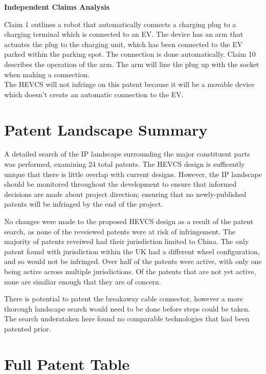 \documentclass [12pt]{article}
\begin{document}
\textbf{Independent Claims Analysis}

Claim 1 outlines a robot that automatically connects a charging plug to a charging terminal which is connected to an EV. The device has an arm that actuates the plug to the charging unit, which has been connected to the EV parked within the parking spot. The connection is done automatically.
Claim 10 describes the operation of the arm. The arm will line the plug up with the socket when making a connection.
\\
The HEVCS will not infringe on this patent because it will be a movable device which doesn’t create an automatic connection to the EV.

\section{Patent Landscape Summary}
A detailed search of the IP landscape surrounding the major constituent parts was performed, examining 24 total patents. The HEVCS design is sufficently unique that there is little overlap with current designs. However, the IP landscape should be monitored throughout the development to ensure that informed decisions are made about project direction; ensuring that no newly-published patents will be infringed by the end of the project.

No changes were made to the proposed HEVCS design as a result of the patent search, as none of the reveiewed patents were at risk of infringement. The majority of patents reveiwed had their jurisdiction limited to China. The only patent found with jurisdiction within the UK had a different wheel configuration, and so would not be infringed. Over half of the patents were active, with only one being active across multiple jurisdictions. Of the patents that are not yet active, none are similiar enough that they are of concern.

There is potential to patent the breakaway cable connector, however a more thorough landscape search would need to be done before steps could be taken. The search underataken here found no comparable technologies that had been patented prior.
 \newpage
 
 

\newpage
\appendix
\section{Full Patent Table}\label{app:full_patent_table}
\end{document}
